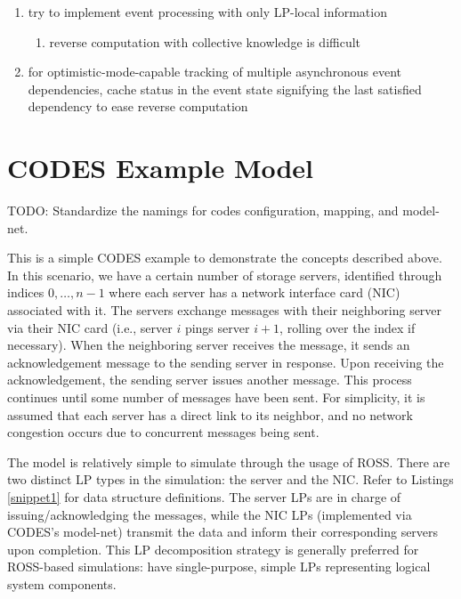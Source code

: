 \documentclass[conference,10pt,compsocconf,onecolumn]{IEEEtran}
\begin{document}
\begin{enumerate}
    \item try to implement event processing with only LP-local information
    \begin{enumerate}
        \item reverse computation with collective knowledge is difficult
    \end{enumerate}

    \item for optimistic-mode-capable tracking of multiple asynchronous event
        dependencies, cache status in the event state signifying the last
        satisfied dependency to ease reverse computation

\end{enumerate}

\section{CODES Example Model}

TODO: Standardize the namings for codes configuration, mapping, and model-net.

This is a simple CODES example to demonstrate the concepts described above.  In
this scenario, we have a certain number of storage servers, identified
through indices $0,\ldots, n-1$ where each server has a network interface card
(NIC) associated with it. The servers exchange messages with their neighboring
server via their NIC card (i.e., server $i$ pings server $i+1$, rolling over the
index if necessary). When the neighboring server receives the message, it sends
an acknowledgement message to the sending server in response. Upon receiving the
acknowledgement, the sending server issues another message. This process continues until
some number of messages have been sent. For simplicity, it is assumed that each
server has a direct link to its neighbor, and no network congestion occurs due
to concurrent messages being sent.

The model is relatively simple to simulate through the usage of ROSS. There are
two distinct LP types in the simulation: the server and the NIC. Refer to
Listings \ref{snippet1} for data structure definitions. The server LPs
are in charge of issuing/acknowledging the messages, while the NIC LPs
(implemented via CODES's model-net) transmit the data and inform their
corresponding servers upon completion. This LP decomposition strategy is
generally preferred for ROSS-based simulations: have single-purpose, simple LPs
representing logical system components.
\end{document}
